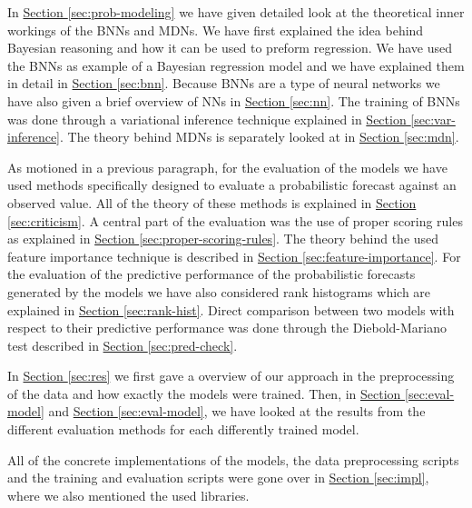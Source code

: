 \documentclass[12pt,a4paper,twoside]{scrartcl}
\numberwithin{equation}{section}
\newcommand{\refsec}[1]{\hyperref[#1]{Section \ref*{#1}}}
\begin{document}
In \refsec{sec:prob-modeling} we have given detailed look at the theoretical inner workings of the BNNs and MDNs. We have first explained the idea behind Bayesian reasoning and how it can be used to preform regression. We have used the BNNs as example of a Bayesian regression model and we have explained them in detail in \refsec{sec:bnn}. Because BNNs are a type of neural networks we have also given a brief overview of NNs in \refsec{sec:nn}. The training of BNNs was done through a variational inference technique explained in \refsec{sec:var-inference}. The theory behind MDNs is separately looked at in \refsec{sec:mdn}.

As motioned in a previous paragraph, for the evaluation of the models we have used methods specifically designed to evaluate a probabilistic forecast against an observed value. All of the theory of these methods is explained in \refsec{sec:criticism}. A central part of the evaluation was the use of proper scoring rules as explained in \refsec{sec:proper-scoring-rules}. The theory behind the used feature importance technique is described in \refsec{sec:feature-importance}. For the evaluation of the predictive performance of the probabilistic forecasts generated by the models we have also considered rank histograms which are explained in \refsec{sec:rank-hist}. Direct comparison between two models with respect to their predictive performance was done through the Diebold-Mariano test described in \refsec{sec:pred-check}.

In \refsec{sec:res} we first gave a overview of our approach in the preprocessing of the data and how exactly the models were trained. Then, in \refsec{sec:eval-model} and \refsec{sec:eval-model}, we have looked at the results from the different evaluation methods for each differently trained model.

All of the concrete implementations of the models, the data preprocessing scripts and the training and evaluation scripts were gone over in \refsec{sec:impl}, where we also mentioned the used libraries.
\end{document}
